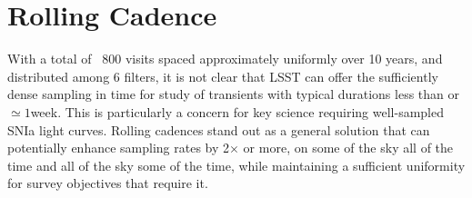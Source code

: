 

%

%
%
%
%
%
%

\section{ Rolling Cadence }
\label{sec:rolling}



With a total of ~800 visits spaced approximately uniformly over 10 years, and distributed among 6 filters,
it is not clear that LSST can offer the sufficiently dense sampling in time for study of transients with typical durations less than or $\simeq 1$week.
This is particularly a concern for key science requiring well-sampled SNIa light curves.  Rolling cadences stand out as a
general solution that can potentially enhance sampling rates by 2$\times$ or more, on some of the sky all of the time and all of the sky some of the time, while maintaining a sufficient uniformity for survey objectives that require it.

